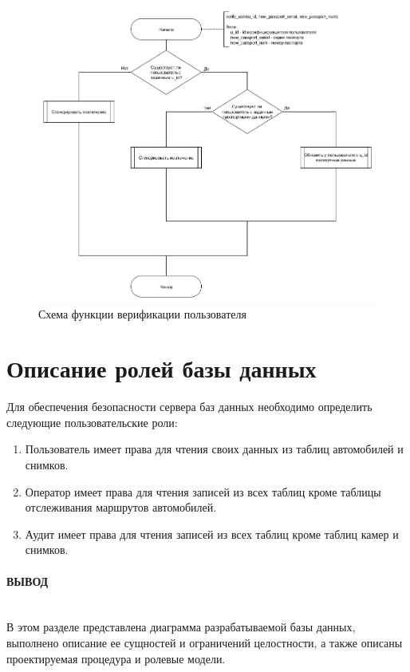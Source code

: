 \begin{figure}[H]
    \centering
    \includegraphics[width=1\linewidth]{images/diograms/procedure_scheme.png}
    \caption{Схема функции верификации пользователя}
    \label{fig:proc}
\end{figure}

\section{Описание ролей базы данных}

Для обеспечения безопасности сервера баз данных необходимо определить следующие пользовательские роли:

\begin{enumerate}
    \item Пользователь имеет права для чтения своих данных из таблиц автомобилей и снимков.
    \item Оператор имеет права для чтения записей из всех таблиц кроме таблицы отслеживания маршрутов автомобилей.
    \item Аудит имеет права для чтения записей из всех таблиц кроме таблиц камер и снимков.
\end{enumerate}

\paragraph*{ВЫВОД} ${}$ \\

В этом разделе представлена диаграмма разрабатываемой базы данных, выполнено описание ее сущностей и ограничений целостности, а также описаны проектируемая процедура и ролевые модели.
